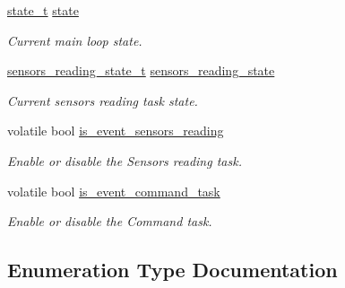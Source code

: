 \begin{DoxyCompactItemize}
\mbox{\label{i2c-th_8h_adc6e5733fc3c22f0a7b2914188c49c90}} 
\hyperlink{i2c-th_8h_aa0aafed44fec19806d8f9ad834be1248}{state\+\_\+t} \hyperlink{i2c-th_8h_adc6e5733fc3c22f0a7b2914188c49c90}{state}
\begin{DoxyCompactList}\small\item\em Current main loop state. \end{DoxyCompactList}\item 
\mbox{\label{i2c-th_8h_a2ad2494d7aa3d5924b49127e1acefe40}} 
\hyperlink{i2c-th_8h_a48bef3d022ff6f88967496ad53a6b953}{sensors\+\_\+reading\+\_\+state\+\_\+t} \hyperlink{i2c-th_8h_a2ad2494d7aa3d5924b49127e1acefe40}{sensors\+\_\+reading\+\_\+state}
\begin{DoxyCompactList}\small\item\em Current sensors reading task state. \end{DoxyCompactList}\item 
\mbox{\label{i2c-th_8h_a023cce184c1d76f85eea707461e61e0c}} 
volatile bool \hyperlink{i2c-th_8h_a023cce184c1d76f85eea707461e61e0c}{is\+\_\+event\+\_\+sensors\+\_\+reading}
\begin{DoxyCompactList}\small\item\em Enable or disable the Sensors reading task. \end{DoxyCompactList}\item 
\mbox{\label{i2c-th_8h_a12ae2319a01786793345e264f29368a4}} 
volatile bool \hyperlink{i2c-th_8h_a12ae2319a01786793345e264f29368a4}{is\+\_\+event\+\_\+command\+\_\+task}
\begin{DoxyCompactList}\small\item\em Enable or disable the Command task. \end{DoxyCompactList}\end{DoxyCompactItemize}


\subsection{Enumeration Type Documentation}
\mbox{\label{i2c-th_8h_a48bef3d022ff6f88967496ad53a6b953}} 
